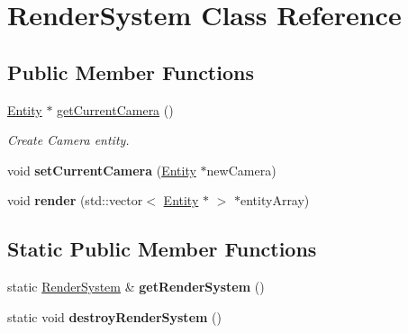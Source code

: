 \hypertarget{class_render_system}{}\section{Render\+System Class Reference}
\label{class_render_system}
\subsection*{Public Member Functions}
\begin{DoxyCompactItemize}
\item 
\hyperlink{class_entity}{Entity} $\ast$ \hyperlink{class_render_system_a9e564b1fdbc1f2b192786565108604a9}{get\+Current\+Camera} ()
\begin{DoxyCompactList}\small\item\em Create Camera entity. \end{DoxyCompactList}\item 
\hypertarget{class_render_system_a29ddcb343529a9b6454508527f57845f}{}void {\bfseries set\+Current\+Camera} (\hyperlink{class_entity}{Entity} $\ast$new\+Camera)\label{class_render_system_a29ddcb343529a9b6454508527f57845f}

\item 
\hypertarget{class_render_system_a0ac3f7e1df83b3a44a6c4830d38bdd5e}{}void {\bfseries render} (std\+::vector$<$ \hyperlink{class_entity}{Entity} $\ast$ $>$ $\ast$entity\+Array)\label{class_render_system_a0ac3f7e1df83b3a44a6c4830d38bdd5e}

\end{DoxyCompactItemize}
\subsection*{Static Public Member Functions}
\begin{DoxyCompactItemize}
\item 
\hypertarget{class_render_system_a5e81ee19719a17b1ea8619305375d281}{}static \hyperlink{class_render_system}{Render\+System} \& {\bfseries get\+Render\+System} ()\label{class_render_system_a5e81ee19719a17b1ea8619305375d281}

\item 
\hypertarget{class_render_system_ae9cf102fb529432575d0df662d115ea9}{}static void {\bfseries destroy\+Render\+System} ()\label{class_render_system_ae9cf102fb529432575d0df662d115ea9}

\end{DoxyCompactItemize}


